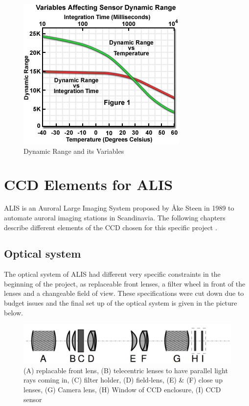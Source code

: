 \begin{figure}[!htbp]
	\centering
	\includegraphics[width=0.6\linewidth]{images/dynrange}
		\caption{Dynamic Range and its Variables\protect\footnotemark}
		 \label{fig:dynrange}
\end{figure}







\section{CCD Elements for ALIS}
ALIS is an Auroral Large Imaging System proposed by Åke Steen in 1989 to automate auroral imaging stations in Scandinavia. The following chapters describe different elements of the CCD chosen for this specific project \citep{brandstrom2003auroral}.

\subsection{Optical system}
The optical system of ALIS had different very specific constraints in the beginning of the project, as replaceable front lenses, a filter wheel in front of the lenses and a changeable field of view. These specifications were cut down due to budget issues and the final set up of the optical system is given in the picture below.

\begin{figure}[!htbp]
	\centering
	\includegraphics[width=0.8\linewidth]{images/optsys}
		\caption{(A) replacable front lens, (B) telecentric lenses to have parallel light rays coming in, (C) filter holder, (D) field-lens, (E) \& (F) close up lenses, (G) Camera lens, (H) Window of CCD enclosure, (I) CCD sensor \citep[c.f.][Fig. 3.7, modified]{brandstrom2003auroral}}
		 \label{fig:optsys}
\end{figure}

